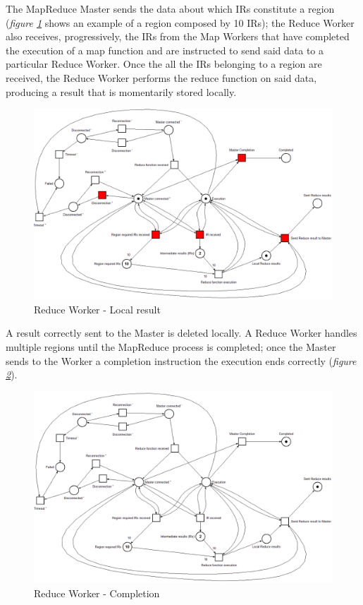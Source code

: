 The MapReduce Master sends the data about which IRs constitute a region (\textit{figure \ref{fig:reduce_worker_petri_net_1}} shows an example of a region composed by 10 IRs); the Reduce Worker also receives, progressively, the IRs from the Map Workers that have completed the execution of a map function and are instructed to send said data to a particular Reduce Worker. Once the all the IRs belonging to a region are received, the Reduce Worker performs the reduce function on said data, producing a result that is momentarily stored locally.

\begin{figure}[!ht]
    \centering
    \includegraphics[scale=0.44]{document/chapters/chapter_6/images/reduce_worker_petri_net_1.png}
    \caption{Reduce Worker - Local result}
    \label{fig:reduce_worker_petri_net_1}
\end{figure}

A result correctly sent to the Master is deleted locally. A Reduce Worker handles multiple regions until the MapReduce process is completed; once the Master sends to the Worker a completion instruction the execution ends correctly (\textit{figure \ref{fig:reduce_worker_petri_net_2}}).

\begin{figure}[!ht]
    \centering
    \includegraphics[scale=0.44]{document/chapters/chapter_6/images/reduce_worker_petri_net_2.png}
    \caption{Reduce Worker - Completion}
    \label{fig:reduce_worker_petri_net_2}
\end{figure}

